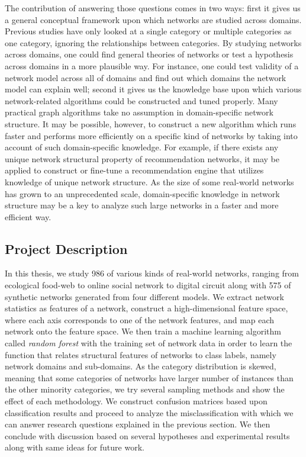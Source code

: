 \documentclass[..]{revtex4}
\begin{document}
The contribution of answering those questions comes in two ways: first it gives us a general conceptual framework upon which networks are studied across domains. Previous studies have only looked at a single category or multiple categories as one category, ignoring the relationships between categories. By studying networks across domains, one could find general theories of networks or test a hypothesis across domains in a more plausible way.  For instance, one could test validity of a network model across all of domains and find out which domains the network model can explain well; second it gives us the knowledge base upon which various network-related algorithms could be constructed and tuned properly.  Many practical graph algorithms take no assumption in domain-specific network structure. It may be possible, however, to construct a new algorithm which runs faster and performs more efficiently on a specific kind of networks by taking into account of such domain-specific knowledge. For example, if there exists any unique network structural property of recommendation networks,  it may be applied to construct or fine-tune a recommendation engine that utilizes knowledge of unique network structure. As the size of some real-world networks has grown to an unprecedented scale, domain-specific knowledge in network structure may be a key to analyze such large networks in a faster and more efficient way.

\subsection{Project Description}

In this thesis, we study 986 of various kinds of real-world networks, ranging from ecological food-web to online social network to digital circuit along with 575 of synthetic networks generated from four different models. We extract network statistics as features of a network, construct a high-dimensional feature space, where each axis corresponds to one of the network features, and map each network onto the feature space. We then train a machine learning algorithm called \textit{random forest} with the training set of network data in order to learn the function that relates structural features of networks to class labels, namely network domains and sub-domains. As the category distribution is skewed, meaning that some categories of networks have larger number of instances than the other minority categories, we try several sampling methods and show the effect of each methodology. We construct confusion matrices based upon classification results and proceed to analyze the misclassification with which we can answer research questions explained in the previous section. We then conclude with discussion based on several hypotheses and experimental results along with same ideas for future work.
\end{document}
